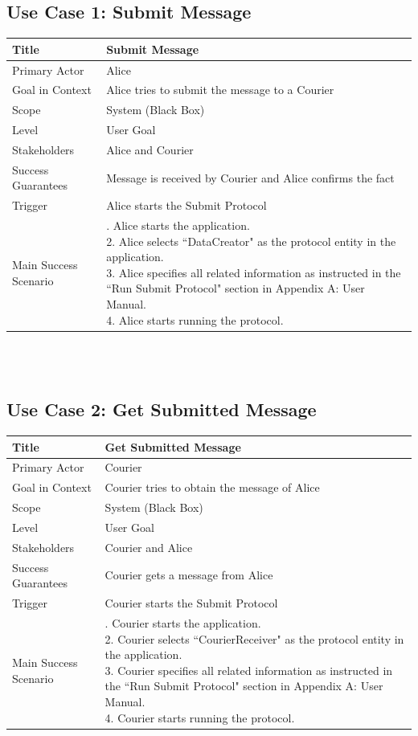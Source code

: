 \subsection*{Use Case 1: Submit Message}
\begin{tabular}{|l|p{}|}
 \hline
 Title & Submit Message \\ \hline
 Primary Actor & Alice \\ \hline
 Goal in Context & Alice tries to submit the message to a Courier \\ \hline
 Scope & System (Black Box) \\ \hline
 Level & User Goal \\ \hline
 Stakeholders & Alice and Courier \\ \hline
 Success Guarantees & Message is received by Courier and Alice confirms the fact \\ \hline
 Trigger & Alice starts the Submit Protocol \\ \hline
 Main Success Scenario & 
 \parbox{9cm}{
  . Alice starts the application. \\
  2. Alice selects ``DataCreator" as the protocol entity in the application. \\
  3. Alice specifies all related information as instructed in the ``Run Submit Protocol" section in Appendix A: User Manual. \\
  4. Alice starts running the protocol.
  \medskip
 }
 \\ \hline
\end{tabular}
\\
\\
\subsection*{Use Case 2: Get Submitted Message} 
\begin{tabular}{|l|p{}|}
 \hline
 Title & Get Submitted Message \\ \hline
 Primary Actor & Courier \\ \hline
 Goal in Context & Courier tries to obtain the message of Alice \\ \hline
 Scope & System (Black Box) \\ \hline
 Level & User Goal \\ \hline
 Stakeholders & Courier and Alice \\ \hline
 Success Guarantees & Courier gets a message from Alice \\ \hline
 Trigger & Courier starts the Submit Protocol \\ \hline
 Main Success Scenario & 
 \parbox{9cm}{
  . Courier starts the application. \\
  2. Courier selects ``CourierReceiver" as the protocol entity in the application. \\
  3. Courier specifies all related information as instructed in the ``Run Submit Protocol" section in Appendix A: User Manual. \\
  4. Courier starts running the protocol.
  \medskip
 }
 \\ \hline
\end{tabular}
\\
\\
